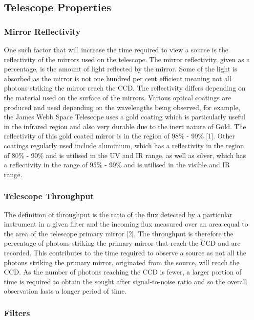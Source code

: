 \documentclass[pdf,color]{UoBnote}
\begin{document}
\subsection{Telescope Properties}
\subsubsection{Mirror Reflectivity}
One such factor that will increase the time required to view a source is the reflectivity of the mirrors used on the telescope. The mirror reflectivity, given as a percentage, is the amount of light reflected by the mirror. Some of the light is absorbed as the mirror is not one hundred per cent efficient meaning not all photons striking the mirror reach the CCD. The reflectivity differs depending on the material used on the surface of the mirrors. Various optical coatings are produced and used depending on the wavelengths being observed, for example, the James Webb Space Telescope uses a gold coating which is particularly useful in the infrared region and also very durable due to the inert nature of Gold. The reflectivity of this gold coated mirror is in the region of 98\% - 99\% [1]. Other coatings regularly used include aluminium, which has a reflectivity in the region of 80\% - 90\% and is utilised in the UV and IR range, as well as silver, which has a reflectivity in the range of 95\% - 99\% and is utilised in the visible and IR range.

\subsubsection{Telescope Throughput}
The definition of throughput is the ratio of the flux detected by a particular instrument in a given filter and the incoming flux measured over an area equal to the area of the telescope primary mirror [2]. The throughput is therefore the percentage of photons striking the primary mirror that reach the CCD and are recorded. This contributes to the time required to observe a source as not all the photons striking the primary mirror, originated from the source, will reach the CCD. As the number of photons reaching the CCD is fewer, a larger portion of time is required to obtain the sought after signal-to-noise ratio and so the overall observation lasts a longer period of time.

\subsubsection{Filters}
\end{document}
